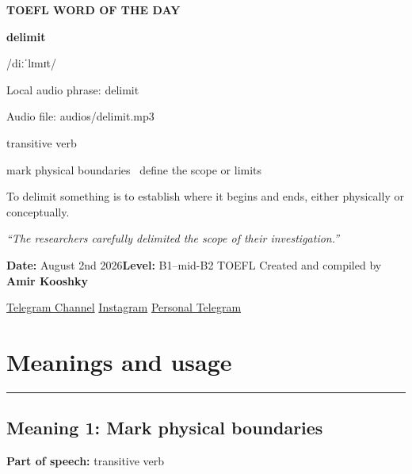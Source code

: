 \documentclass[11pt]{article}
\newcommand{\sectionrule}{\par\vspace{-0.5em}\noindent\textcolor{Accent}{\rule{\linewidth}{0.6pt}}\par}
\begin{document}
\begin{center}
{\sffamily\bfseries\color{Accent} TOEFL WORD OF THE DAY\par}
\vspace{8mm}
{\fontsize{42}{48}\selectfont\bfseries delimit\par}
\vspace{2mm}
{\Large\sffamily\color{Accent} /diːˈlɪmɪt/\par}
\vspace{2mm}
{\small\sffamily Local audio phrase: delimit\par}
{\small\sffamily Audio file: audios/delimit.mp3\par}
\vspace{2mm}
{\large\sffamily\color{Muted} transitive verb\par}
\vspace{5mm}
{\sffamily mark physical boundaries \textbullet\ define the scope or limits\par}
\vspace{6mm}
{\large To delimit something is to establish where it begins and ends, either physically or conceptually.\par}
\vspace{6mm}
\begin{minipage}{0.84\textwidth}
\itshape “The researchers carefully delimited the scope of their investigation.”
\end{minipage}\par
\vspace{10mm}
\textbf{Date:} August 2nd 2026\quad\textbullet\quad \textbf{Level:} B1--mid-B2 TOEFL
\vfill
Created and compiled by \textbf{Amir Kooshky}\par
\vspace{2mm}
\href{https://t.me/KooshkyTOEFL}{Telegram Channel}\quad\textbullet\quad
\href{https://www.instagram.com/kooshkytoefl}{Instagram}\quad\textbullet\quad
\href{https://t.me/KooshkyTOEFL\_pv}{Personal Telegram}
\end{center}
\newpage
\tableofcontents
\newpage

\section{Meanings and usage}
\sectionrule
\subsection{Meaning 1: Mark physical boundaries}
\textbf{Part of speech:} transitive verb
\end{document}
